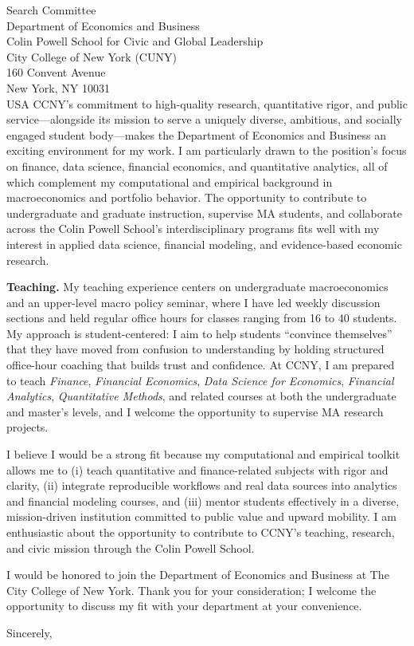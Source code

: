 \documentclass[11pt,letterpaper]{letter}
\begin{document}
\begin{letter}{Search Committee \\
Department of Economics and Business \\
Colin Powell School for Civic and Global Leadership \\
City College of New York (CUNY) \\
160 Convent Avenue \\
New York, NY 10031 \\ USA}
CCNY’s commitment to high-quality research, quantitative rigor, and public service—alongside its mission to serve a uniquely diverse, ambitious, and socially engaged student body—makes the Department of Economics and Business an exciting environment for my work. I am particularly drawn to the position’s focus on finance, data science, financial economics, and quantitative analytics, all of which complement my computational and empirical background in macroeconomics and portfolio behavior. The opportunity to contribute to undergraduate and graduate instruction, supervise MA students, and collaborate across the Colin Powell School’s interdisciplinary programs fits well with my interest in applied data science, financial modeling, and evidence-based economic research.

\textbf{Teaching.} My teaching experience centers on undergraduate macroeconomics and an upper-level macro policy seminar, where I have led weekly discussion sections and held regular office hours for classes ranging from 16 to 40 students. My approach is student-centered: I aim to help students “convince themselves” that they have moved from confusion to understanding by holding structured office-hour coaching that builds trust and confidence. At CCNY, I am prepared to teach \textit{Finance}, \textit{Financial Economics}, \textit{Data Science for Economics}, \textit{Financial Analytics}, \textit{Quantitative Methods}, and related courses at both the undergraduate and master’s levels, and I welcome the opportunity to supervise MA research projects.

I believe I would be a strong fit because my computational and empirical toolkit allows me to (i) teach quantitative and finance-related subjects with rigor and clarity, (ii) integrate reproducible workflows and real data sources into analytics and financial modeling courses, and (iii) mentor students effectively in a diverse, mission-driven institution committed to public value and upward mobility. I am enthusiastic about the opportunity to contribute to CCNY’s teaching, research, and civic mission through the Colin Powell School.

I would be honored to join the Department of Economics and Business at The City College of New York. Thank you for your consideration; I welcome the opportunity to discuss my fit with your department at your convenience.

\closing{Sincerely,}

\end{letter}
\end{document}

